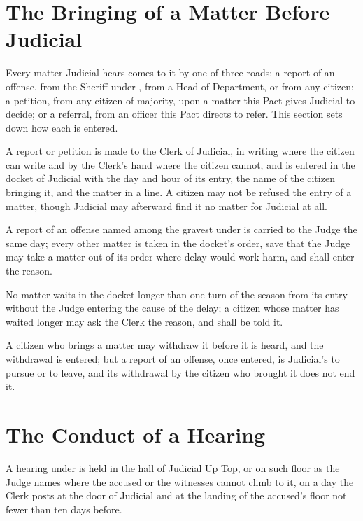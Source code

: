 \section{The Bringing of a Matter Before Judicial}
\label{sec:judicial:bringing-of-a-matter-before-judicial}

Every matter Judicial hears comes to it by one of three roads: a report of an offense, from the Sheriff under , from a Head of Department, or from any citizen; a petition, from any citizen of majority, upon a matter this Pact gives Judicial to decide; or a referral, from an officer this Pact directs to refer. This section sets down how each is entered.

\begin{clauses}
\item A report or petition is made to the Clerk of Judicial, in writing where the citizen can write and by the Clerk's hand where the citizen cannot, and is entered in the docket of Judicial with the day and hour of its entry, the name of the citizen bringing it, and the matter in a line. A citizen may not be refused the entry of a matter, though Judicial may afterward find it no matter for Judicial at all.
\item A report of an offense named among the gravest under  is carried to the Judge the same day; every other matter is taken in the docket's order, save that the Judge may take a matter out of its order where delay would work harm, and shall enter the reason.
\item No matter waits in the docket longer than one turn of the season from its entry without the Judge entering the cause of the delay; a citizen whose matter has waited longer may ask the Clerk the reason, and shall be told it.
\item A citizen who brings a matter may withdraw it before it is heard, and the withdrawal is entered; but a report of an offense, once entered, is Judicial's to pursue or to leave, and its withdrawal by the citizen who brought it does not end it.
\end{clauses}

\section{The Conduct of a Hearing}
\label{sec:judicial:conduct-of-a-hearing}

A hearing under  is held in the hall of Judicial Up Top, or on such floor as the Judge names where the accused or the witnesses cannot climb to it, on a day the Clerk posts at the door of Judicial and at the landing of the accused's floor not fewer than ten days before.

